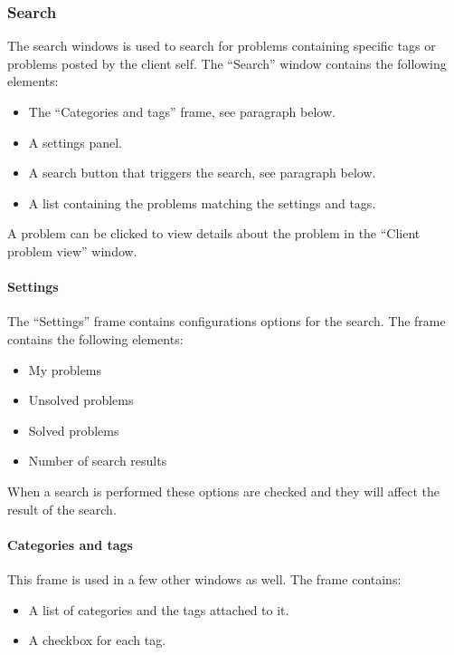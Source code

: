 
\subsubsection{Search}
The search windows is used to search for problems containing specific tags or problems posted by the client self. The ``Search'' window contains the following elements:
\begin{itemize}
	\item The ``Categories and tags'' frame, see paragraph below.
	\item A settings panel.
	\item A search button that triggers the search, see paragraph below.
	\item A list containing the problems matching the settings and tags.
\end{itemize}
A problem can be clicked to view details about the problem in the ``Client problem view'' window.

\paragraph{Settings}
The ``Settings'' frame contains configurations options for the search.
The frame contains the following elements:
\begin{itemize}
	\item My problems 
	\item Unsolved problems
	\item Solved problems 
	\item Number of search results
\end{itemize}
When a search is performed these options are checked and they will affect the result of the search.

\paragraph{Categories and tags} 
This frame is used in a few other windows as well. 
The frame contains:
\begin{itemize}
	\item A list of categories and the tags attached to it. 
	\item A checkbox for each tag.
\end{itemize} 

